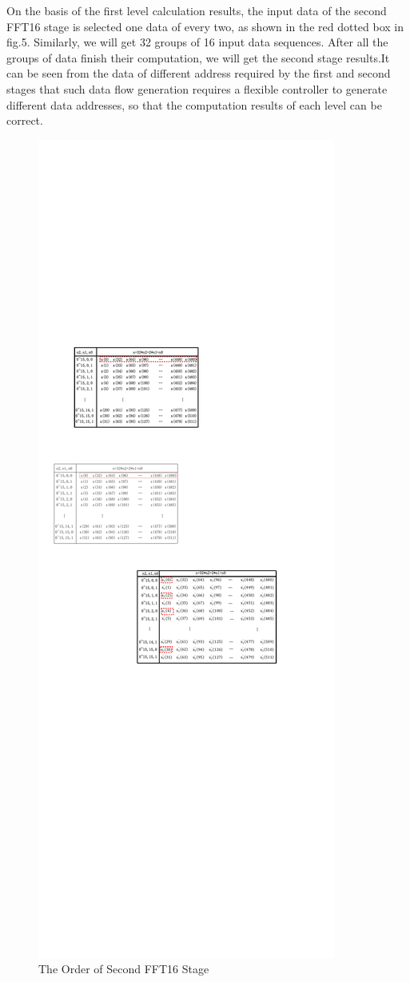 \documentclass[journal]{IEEEtran}
\begin{document}
On the basis of the first level calculation results, the input data of the second FFT16 stage is selected one data of every two, as shown in the red dotted box in fig.5. Similarly, we will get 32 groups of 16 input data sequences. After all the groups of data finish their computation, we will get the second stage results.It can be seen from the data of different address required by the first and second stages that such data flow generation requires a flexible controller to generate different data addresses, so that the computation results of each level can be correct.
\begin{figure}[h]
\centering
\includegraphics[scale=0.9]{figures/figure5.pdf}
\caption{The Order of Second FFT16 Stage}
\end{figure}
\end{document}
